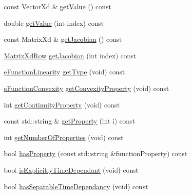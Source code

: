 \begin{DoxyCompactItemize}
\item 
const Vector\+Xd \& \hyperlink{structocra_1_1FunctionInterfaceMapping_3_01X_3_01Function_01_4_01_4_a80402679b788ec002d7fa16a2c36838f}{get\+Value} () const
\item 
double \hyperlink{structocra_1_1FunctionInterfaceMapping_3_01X_3_01Function_01_4_01_4_a97e745dc7e7a8a2af03e57d71aefa31c}{get\+Value} (int index) const
\item 
const Matrix\+Xd \& \hyperlink{structocra_1_1FunctionInterfaceMapping_3_01X_3_01Function_01_4_01_4_a273e455d6ab21d57da6c7f37d9d4a7cb}{get\+Jacobian} () const
\item 
\hyperlink{namespaceocra_a608bf0522317ed1df3bbfc6a5753bc01}{Matrix\+Xd\+Row} \hyperlink{structocra_1_1FunctionInterfaceMapping_3_01X_3_01Function_01_4_01_4_a65d422e9ec5829299f0485e78391d4b6}{get\+Jacobian} (int index) const
\item 
\hyperlink{namespaceocra_a87b525b5508b0f6e9d931f14c7c226ab}{e\+Function\+Linearity} \hyperlink{structocra_1_1FunctionInterfaceMapping_3_01X_3_01Function_01_4_01_4_aa94a871947504091aa69bd1b704d5120}{get\+Type} (void) const
\item 
\hyperlink{namespaceocra_ae6e8dca6121e9618486a449754876119}{e\+Function\+Convexity} \hyperlink{structocra_1_1FunctionInterfaceMapping_3_01X_3_01Function_01_4_01_4_a35d5a52fad803ab14e8840201b99badb}{get\+Convexity\+Property} (void) const
\item 
int \hyperlink{structocra_1_1FunctionInterfaceMapping_3_01X_3_01Function_01_4_01_4_a4fa10e2380f7b0933e8a68bdd51d97c7}{get\+Continuity\+Property} (void) const
\item 
const std\+::string \& \hyperlink{structocra_1_1FunctionInterfaceMapping_3_01X_3_01Function_01_4_01_4_a88001c322d25b358b7a88662268ccd12}{get\+Property} (int i) const
\item 
int \hyperlink{structocra_1_1FunctionInterfaceMapping_3_01X_3_01Function_01_4_01_4_a2b76f1e86519c85c2e6f8147356f2139}{get\+Number\+Of\+Properties} (void) const
\item 
bool \hyperlink{structocra_1_1FunctionInterfaceMapping_3_01X_3_01Function_01_4_01_4_a8fbc174cf47fff622585a56db6444286}{has\+Property} (const std\+::string \&function\+Property) const
\item 
bool \hyperlink{structocra_1_1FunctionInterfaceMapping_3_01X_3_01Function_01_4_01_4_a7fb5dac6a6f5657491398e5df37a4d66}{is\+Explicitly\+Time\+Dependant} (void) const
\item 
bool \hyperlink{structocra_1_1FunctionInterfaceMapping_3_01X_3_01Function_01_4_01_4_a42c4de44a91e30e07db6934ed81ead09}{has\+Separable\+Time\+Dependancy} (void) const
\end{DoxyCompactItemize}


